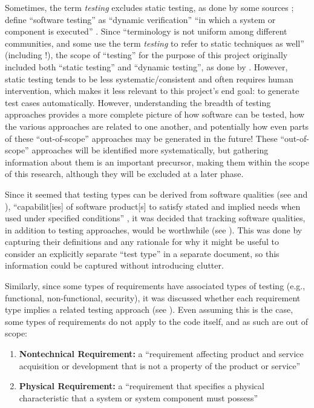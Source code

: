 Sometimes, the term \emph{testing} excludes static testing, as done by some
sources \citep[p.~5-1]{SWEBOK2024}; \citeauthor{IEEE2017} define ``software
testing'' as ``dynamic verification'' ``in which a system or component is
executed'' \citeyearpar[p.~427]{IEEE2017}. Since ``terminology is not uniform
among different communities, and some use the term \emph{testing} to refer to
static techniques as well'' \cite[p.~5-2]{SWEBOK2024} (including
\citet[p.~440]{IEEE2017}!), the scope of ``testing'' for the purpose of this
project originally included both ``static testing'' and ``dynamic testing'', as
done by \citet[p.~17]{IEEE2022}. However, static testing tends to be less
systematic/consistent and often requires human intervention, which makes it
less relevant to this project's end goal: to generate test cases automatically.
However, understanding the breadth of testing approaches provides a more
complete picture of how software can be tested, how the various approaches are
related to one another, and potentially how even parts of these ``out-of-scope''
approaches may be generated in the future! These ``out-of-scope'' approaches
will be identified more systematically, but gathering information about them is
an important precursor, making them within the scope of this research, although
they will be excluded at a later phase.

\label{chap:notes:sec:derived-from-qualities}
Since it seemed that testing types can be derived from software qualities
(see  and ), ``capabilit[ies] of software
product[s] to satisfy stated and implied needs when used under specified
conditions'' \citep[p.~424]{IEEE2017} , it was decided that tracking
software qualities, in addition to testing approaches, would be worthwhile
(see ). This was done by capturing their definitions and any
rationale for why it might be useful to consider an explicitly separate
``test type'' in a separate document, so this information could be captured
without introducing clutter.

Similarly, since some types of requirements have associated types of
testing (e.g., functional, non-functional, security), it was discussed whether
each requirement type implies a related testing approach
(see ). Even assuming this is the case, some types of
requirements do not apply to the code itself, and as such are out of scope:

\begin{enumerate}
      \item \textbf{Nontechnical Requirement:} a ``requirement affecting product
            and service acquisition or development that is not a property of
            the product or service'' \cite[p.~293]{IEEE2017}
      \item \textbf{Physical Requirement:} a ``requirement that specifies a
            physical characteristic that a system or system component must
            possess'' \cite[p.~322]{IEEE2017}
\end{enumerate}

